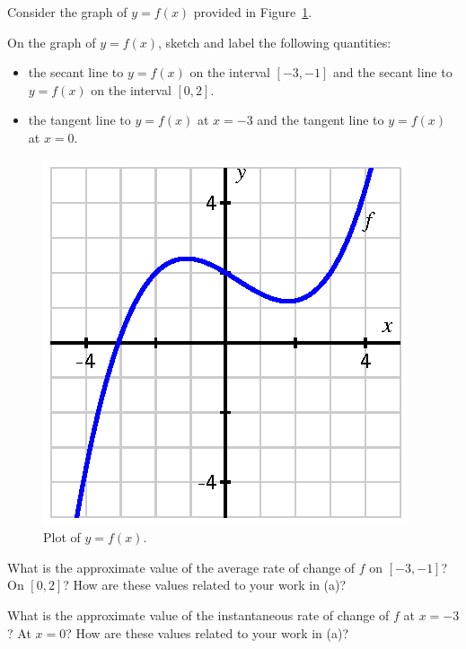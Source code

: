 \begin{exercises} 
\item Consider the graph of $y = f(x)$ provided in Figure~\ref{F:1.3.Ez1}.
	\ba
		\item On the graph of $y = f(x)$, sketch and label the following quantities:
		\begin{itemize}
			\item the secant line to $y = f(x)$ on the interval $[-3,-1]$ and the secant line to $y = f(x)$ on the interval $[0,2]$.
			\item the tangent line to $y = f(x)$ at $x = -3$ and the tangent line to $y = f(x)$ at $x = 0$.
		\end{itemize}
\begin{figure}[h]
  \begin{center}
 \includegraphics{figures/1_3_Ez1.eps}    \end{center}
   \caption{Plot of $y = f(x)$.} \label{F:1.3.Ez1}
\end{figure}
		\item What is the approximate value of the average rate of change of $f$ on $[-3,-1]$?  On $[0,2]$?  How are these values related to your work in (a)?
		\item What is the approximate value of the instantaneous rate of change of $f$ at $x = -3$?  At $x = 0$?  How are these values related to your work in (a)?

	\ea	
	

\end{exercises}
